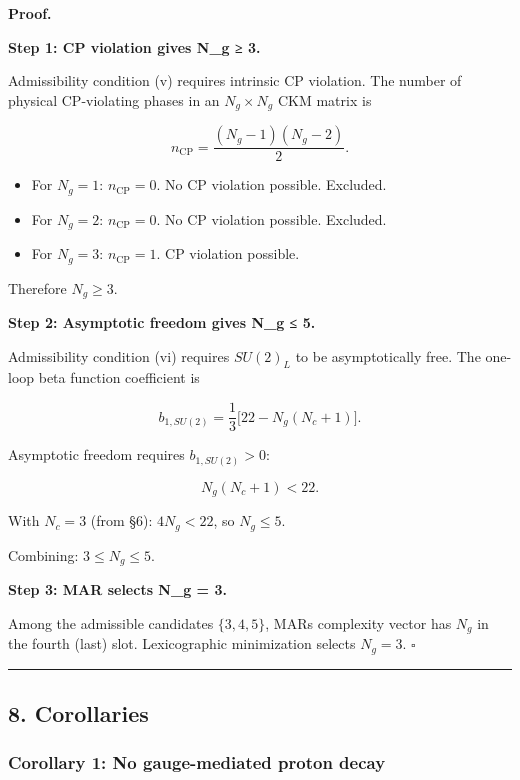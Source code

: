 \textbf{Proof.}

\textbf{Step 1: CP violation gives N\_g ≥ 3.}

Admissibility condition (v) requires intrinsic CP violation. The number of physical CP-violating phases in an \(N_g \times N_g\) CKM matrix is

\[n_{\mathrm{CP}} = \frac{(N_g - 1)(N_g - 2)}{2}.\]

\begin{itemize}
\tightlist
\item
  For \(N_g = 1\): \(n_{\mathrm{CP}} = 0\). No CP violation possible. Excluded.
\item
  For \(N_g = 2\): \(n_{\mathrm{CP}} = 0\). No CP violation possible. Excluded.
\item
  For \(N_g = 3\): \(n_{\mathrm{CP}} = 1\). CP violation possible.
\end{itemize}

Therefore \(N_g \geq 3\).

\textbf{Step 2: Asymptotic freedom gives N\_g ≤ 5.}

Admissibility condition (vi) requires \(SU(2)_L\) to be asymptotically free. The one-loop beta function coefficient is

\[b_{1,SU(2)} = \frac{1}{3}\bigl[22 - N_g(N_c + 1)\bigr].\]

Asymptotic freedom requires \(b_{1,SU(2)} > 0\):

\[N_g(N_c + 1) < 22.\]

With \(N_c = 3\) (from §6): \(4N_g < 22\), so \(N_g \leq 5\).

Combining: \(3 \leq N_g \leq 5\).

\textbf{Step 3: MAR selects N\_g = 3.}

Among the admissible candidates \(\{3, 4, 5\}\), MAR\textquotesingle s complexity vector has \(N_g\) in the fourth (last) slot. Lexicographic minimization selects \(N_g = 3\). \(\square\)

\begin{center}\rule{0.5\linewidth}{0.5pt}\end{center}

\subsection{8. Corollaries}\label{8-corollaries}

\subsubsection{Corollary 1: No gauge-mediated proton decay}\label{corollary-1-no-gauge-mediated-proton-decay}

